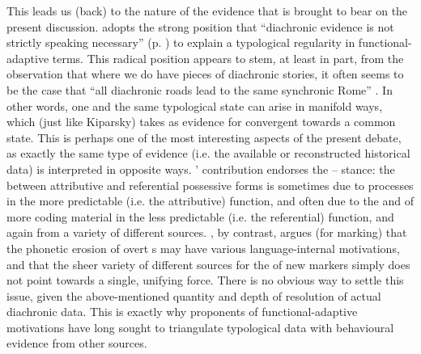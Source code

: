 \documentclass[output=paper]{langsci/langscibook}
\begin{document}
This leads us (back) to the nature of the evidence that is brought to bear on the present discussion.  adopts the strong position that “diachronic evidence is not strictly speaking necessary” (p. \pageref{p:haspelmath:strictlyspeakingnecessary}) to explain a typological regularity in functional-adaptive terms. This radical position appears to stem, at least in part, from the observation that where we do have pieces of diachronic stories, it often seems to be the case that “all diachronic roads lead to the same synchronic Rome” \citep[38]{Kiparsky2008}. In other words, one and the same typological state can arise in manifold ways, which  (just like Kiparsky) takes as evidence for convergent  towards a common  state. This is perhaps one of the most interesting aspects of the present debate, as exactly the same type of evidence (i.e. the available or reconstructed historical data) is interpreted in opposite ways. ’ contribution endorses the – stance: the  between attributive and referential possessive forms is sometimes due to  processes in the more predictable (i.e. the attributive) function, and often due to the  and  of more coding material in the less predictable (i.e. the referential) function, and again from a variety of different sources. , by contrast, argues (for  marking) that the phonetic erosion of overt s may have various language-internal motivations, and that the sheer variety of different sources for the  of new  markers simply does not point towards a single, unifying force. There is no obvious way to settle this issue, given the above-mentioned quantity and depth of resolution of actual diachronic data. This is exactly why proponents of functional-adaptive motivations have long sought to triangulate typological data with behavioural evidence from other sources.
\end{document}
